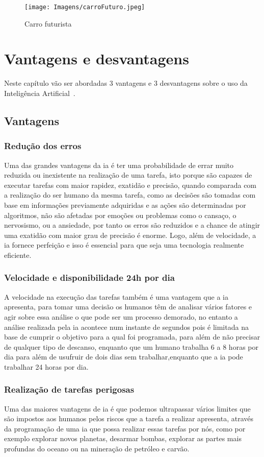 \documentclass{report}
\begin{document}
\begin{figure}
    \centering
    \texttt{[image: Imagens/carroFuturo.jpeg]}
    \caption{Carro futurista}
    \label{fig:carroFuturo}
\end{figure}

\chapter{Vantagens e desvantagens}
\label{chap.vd}
Neste capítulo vão ser abordadas 3 vantagens e 3 desvantagens sobre o uso da Inteligência Artificial~\cite{SAS:2022}.


\section{Vantagens}
\subsection{Redução dos erros}
Uma das grandes vantagens da \ac{ia} é ter uma probabilidade de errar muito reduzida ou inexistente na realização de uma tarefa, isto porque são capazes de executar tarefas com maior rapidez, exatidão e precisão, quando comparada com a realização do ser humano da mesma tarefa, como as decisões são tomadas com base em informações previamente adquiridas e as ações são determinadas por algoritmos,  não são afetadas por emoções ou problemas como o cansaço, o nervosismo, ou a ansiedade, por tanto os erros são reduzidos e a chance de atingir uma exatidão com maior grau de precisão é enorme. Logo, além de velocidade, a \ac{ia} fornece perfeição e isso é essencial para que seja uma tecnologia realmente eficiente.

\subsection{Velocidade e disponibilidade 24h por dia}
A velocidade na execução das tarefas também é uma vantagem que a \ac{ia} apresenta, para tomar uma decisão os humanos têm de analisar vários fatores e agir sobre essa análise o que pode ser um processo demorado, no entanto a análise realizada pela \ac{ia} acontece num instante de segundos pois é limitada na base de cumprir o objetivo para a qual foi programada, para além de não precisar de qualquer tipo de descanso, enquanto que um humano trabalha 6 a 8 horas por dia para além de usufruir de dois dias sem trabalhar,enquanto que a \ac{ia} pode trabalhar 24 horas por dia.

\subsection{Realização de tarefas perigosas}
Uma das maiores vantagens de \ac{ia} é que podemos ultrapassar vários limites que são impostos aos humanos pelos riscos que a tarefa a realizar apresenta, através da programação de uma \ac{ia} que possa realizar essas tarefas por nós, como por exemplo explorar novos planetas, desarmar bombas, explorar as partes mais profundas do oceano ou na mineração de petróleo e carvão.
\end{document}
